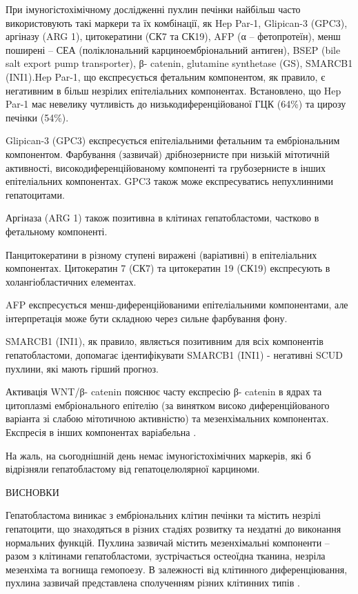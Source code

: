 При  імуногістохімічному  дослідженні пухлин печінки  найбільш часто використовують  такі маркери та їх комбінації,  як  Hep Par-1, Glipican-3 (GPC3), аргіназу  (ARG 1), цитокератини (СК7 та СК19),  AFP (α – фетопротеїн), менш поширені – СЕА (поліклональний карциноембріональний антиген), BSEP (bile salt export pump transporter),  β- catenin, glutamine synthetase (GS), SMARCB1 (INI1).Hep Par-1, що експресується  фетальним компонентом, як правило, є  негативним в більш незрілих епітеліальних компонентах. Встановлено, що Hep Par-1 має невелику чутливість до низькодиференційованої  ГЦК (64\%) та цирозу печінки  (54\%). 

Glipican-3 (GPC3) експресується епітеліальними фетальним та ембріональним компонентом. Фарбування (зазвичай)  дрібнозернисте  при низькій мітотичній активності, високодиференційованому компоненті та грубозернисте в інших епітеліальних компонентах.      GPC3  також може експресуватись непухлинними гепатоцитами. 

Аргіназа (ARG 1) також позитивна в клітинах гепатобластоми, частково в фетальному компоненті.

Панцитокератини в різному ступені виражені (варіативні) в епітеліальних компонентах. Цитокератин 7 (СК7) та цитокератин 19 (СК19) експресують в холангіобластичних елементах.

AFP  експресується  менш-диференційованими епітеліальними компонентами,  але  інтерпретація  може бути складною через сильне фарбування фону.

SMARCB1 (INI1), як правило, являється позитивним для всіх компонентів гепатобластоми, допомагає ідентифікувати  SMARCB1 (INI1) - негативні  SCUD пухлини, які мають гірший прогноз.

Активація  WNT/β- catenin пояснює часту експресію   β- catenin в ядрах та  цитоплазмі ембріонального епітелію (за винятком  високо диференційованого варіанта зі слабою мітотичною активністю) та мезенхімальних  компонентах.  Експресія в інших компонентах варіабельна \cite{pmid18970927}.

На жаль, на сьогоднішній день  немає імуногістохімічних маркерів, які б відрізняли гепатобластому від гепатоцелюлярної карциноми.

ВИСНОВКИ

Гепатобластома виникає з ембріональних клітин печінки та містить незрілі гепатоцити, що знаходяться в різних стадіях розвитку та нездатні до виконання нормальних функцій. Пухлина зазвичай містить мезенхімальні компоненти – разом з клітинами гепатобластоми, зустрічається остеоїдна  тканина, незріла мезенхіма та вогнища гемопоезу. В залежності від клітинного диференціювання, пухлина зазвичай представлена сполученням різних клітинних типів \cite{pmid16123986}.

